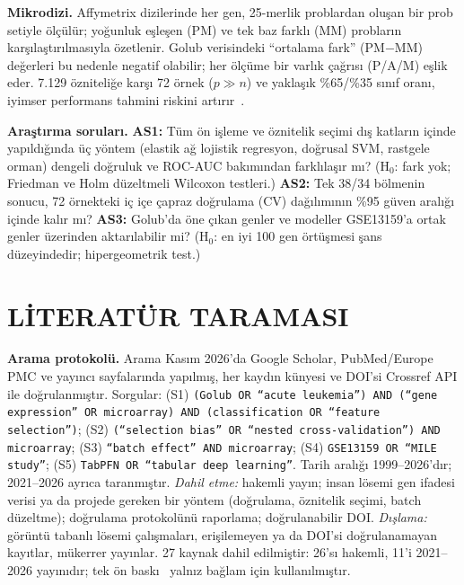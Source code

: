 \documentclass[conference]{IEEEtran}
\begin{document}
\textbf{Mikrodizi.} Affymetrix dizilerinde her gen, 25-merlik problardan oluşan bir prob setiyle ölçülür; yoğunluk eşleşen (PM) ve tek baz farklı (MM) probların karşılaştırılmasıyla özetlenir. Golub verisindeki ``ortalama fark'' (PM$-$MM) değerleri bu nedenle negatif olabilir; her ölçüme bir varlık çağrısı (P/A/M) eşlik eder. 7.129 özniteliğe karşı 72 örnek ($p\gg n$) ve yaklaşık \%65/\%35 sınıf oranı, iyimser performans tahmini riskini artırır~\cite{simon2003,ambroise2002}.

\textbf{Araştırma soruları.} \textbf{AS1:} Tüm ön işleme ve öznitelik seçimi dış katların içinde yapıldığında üç yöntem (elastik ağ lojistik regresyon, doğrusal SVM, rastgele orman) dengeli doğruluk ve ROC-AUC bakımından farklılaşır mı? (H$_0$: fark yok; Friedman ve Holm düzeltmeli Wilcoxon testleri.) \textbf{AS2:} Tek 38/34 bölmenin sonucu, 72 örnekteki iç içe çapraz doğrulama (CV) dağılımının \%95 güven aralığı içinde kalır mı? \textbf{AS3:} Golub'da öne çıkan genler ve modeller GSE13159'a ortak genler üzerinden aktarılabilir mi? (H$_0$: en iyi 100 gen örtüşmesi şans düzeyindedir; hipergeometrik test.)

\section{LİTERATÜR TARAMASI}
\textbf{Arama protokolü.} Arama Kasım 2026'da Google Scholar, PubMed/Europe PMC ve yayıncı sayfalarında yapılmış, her kaydın künyesi ve DOI'si Crossref API ile doğrulanmıştır. Sorgular: (S1) \texttt{(Golub OR ``acute leukemia'') AND (``gene expression'' OR microarray) AND (classification OR ``feature selection'')}; (S2) \texttt{(``selection bias'' OR ``nested cross-validation'') AND microarray}; (S3) \texttt{``batch effect'' AND microarray}; (S4) \texttt{GSE13159 OR ``MILE study''}; (S5) \texttt{TabPFN OR ``tabular deep learning''}. Tarih aralığı 1999--2026'dır; 2021--2026 ayrıca taranmıştır. \emph{Dahil etme:} hakemli yayın; insan lösemi gen ifadesi verisi ya da projede gereken bir yöntem (doğrulama, öznitelik seçimi, batch düzeltme); doğrulama protokolünü raporlama; doğrulanabilir DOI. \emph{Dışlama:} görüntü tabanlı lösemi çalışmaları, erişilemeyen ya da DOI'si doğrulanamayan kayıtlar, mükerrer yayınlar. 27 kaynak dahil edilmiştir: 26'sı hakemli, 11'i 2021--2026 yayınıdır; tek ön baskı~\cite{zhou2025} yalnız bağlam için kullanılmıştır.
\end{document}
